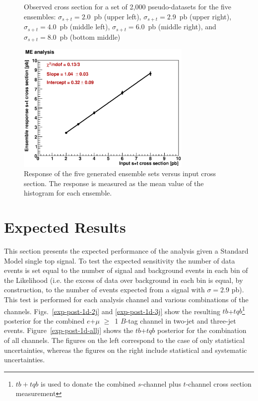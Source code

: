 \begin{figure}[!h!tbp]
\begin{center}
\end{center}
\vspace{-0.1in}
\caption{Observed cross section for a set of 2,000 pseudo-datasets for the five ensembles: $\sigma_{s+t}=2.0$~pb (upper left), $\sigma_{s+t}=2.9$~pb (upper right), $\sigma_{s+t}=4.0$~pb (middle left), $\sigma_{s+t}=6.0$~pb (middle right), and $\sigma_{s+t}=8.0$~pb (bottom middle)}
\label{blue}
\end{figure}


\begin{figure}[!h!tbp]
\begin{center}
\includegraphics[width=0.75\textwidth]{eps/Limits/Linearity.eps}
\end{center}
\vspace{-0.1in}
\caption{Response of the five generated ensemble sets versus input cross section. The response is measured as the mean value of the histogram for each ensemble.}
\label{linearity}
\end{figure}

\clearpage
\section{Expected Results}
\label{exp-performance}

This section presents the expected performance of the analysis given a Standard Model single top signal. To test the expected sensitivity the number of data events is set equal to the number of signal and background events in each bin of the Likelihood (i.e. the excess of data over background in each bin is equal, by construction, to the number of events expected from a signal with $\sigma=2.9$ pb). This test is performed for each analysis channel and various combinations of the channels. Figs.~\ref{exp-post-1d-2j} and \ref{exp-post-1d-3j} show the
resulting $tb$+$tqb$\footnote{$tb+tqb$ is used to donate the combined $s$-channel plus $t$-channel cross section measurement} posterior for the combined $e$+$\mu$ $\geq$~1
$B$-tag channel in two-jet and three-jet events.
Figure~\ref{exp-post-1d-allj} shows the $tb$+$tqb$ posterior for the
combination of all channels. The figures on the left correspond to the case
of only statistical uncertainties, whereas the figures on the right include statistical and systematic uncertainties. 

